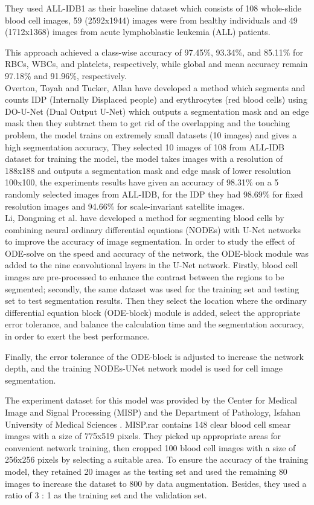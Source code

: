 \documentclass[conference]{IEEEtran}
\begin{document}
They used ALL-IDB1 as their baseline dataset which consists of 108 whole-slide blood cell images, 59 (2592x1944) images were from healthy individuals and 49 (1712x1368) images from acute lymphoblastic leukemia (ALL) patients.

This approach achieved a class-wise accuracy of 97.45\%, 93.34\%, and 85.11\% for RBCs, WBCs, and platelets, respectively, while global and mean accuracy remain 97.18\% and 91.96\%, respectively.\\

Overton, Toyah and Tucker, Allan \cite{10.1007/978-3-030-44584-3_31} have developed a method which segments and counts IDP (Internally Displaced people) and erythrocytes (red blood cells) using DO-U-Net (Dual Output U-Net) which outputs a segmentation mask and an edge mask then they subtract them to get rid of the overlapping and the touching problem, the model trains on extremely small datasets (10 images) and gives a high segmentation accuracy, They selected 10 images of 108 from ALL-IDB dataset for training the model, the model takes images with a resolution of 188x188 and outputs a segmentation mask and edge mask of lower resolution 100x100, the experiments results have given an accuracy of 98.31\% on a 5 randomly selected images from ALL-IDB, for the IDP they had 98.69\% for fixed resolution images and 94.66\% for scale-invariant satellite images.\\

Li, Dongming et al. \cite{li2021robust} have developed a method for segmenting blood cells by combining neural ordinary differential equations (NODEs) with U-Net networks to improve the accuracy of image segmentation. In order to study the effect of ODE-solve on the speed and accuracy of the network, the ODE-block module was added to the nine convolutional layers in the U-Net network. Firstly, blood cell images are pre-processed to enhance the contrast between the regions to be segmented; secondly, the same dataset was used for the training set and testing set to test segmentation results. Then they select the location where the ordinary differential equation block (ODE-block) module is added, select the appropriate error tolerance, and balance the calculation time and the segmentation accuracy, in order to exert the best performance.\

Finally, the error tolerance of the ODE-block is adjusted to increase the network depth, and the training NODEs-UNet network model is used for cell image segmentation. 

The experiment dataset for this model was provided by the Center for Medical Image and Signal Processing (MISP) and the Department of Pathology, Isfahan University of Medical Sciences \cite{sarrafzadeh2014selection}. MISP.rar contains 148 clear blood cell smear images with a size of 775x519 pixels. They picked up appropriate areas for convenient network training, then cropped 100 blood cell images with a size of 256x256 pixels by selecting a suitable area. To ensure the accuracy of the training model, they retained 20 images as the testing set and used the remaining 80 images to increase the dataset to 800 by data augmentation. Besides, they used a ratio of 3 : 1 as the training set and the validation set.
\end{document}
